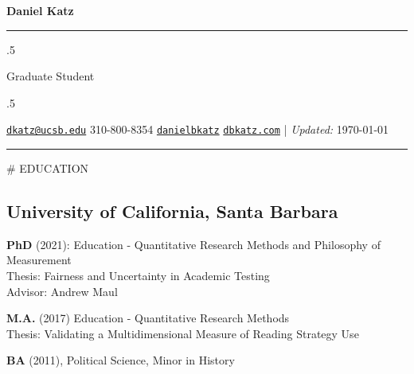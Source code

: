 \documentclass[11pt,]{article}
\begin{document}
\centerline{\huge \bf Daniel Katz}

\vspace{2 mm}

\hrule

\vspace{2 mm}

\moveleft.5\hoffset\centerline{Graduate Student}

\moveleft.5\hoffset\centerline{ \faEnvelopeO \hspace{1 mm} \href{mailto:}{\tt \href{mailto:dkatz@ucsb.edu}{\nolinkurl{dkatz@ucsb.edu}}} \hspace{1 mm}  \faPhone \hspace{1 mm}  310-800-8354  \hspace{1 mm}  \faGithub \hspace{1 mm} \href{http://github.com/danielbkatz}{\tt danielbkatz} \hspace{1 mm}     \faGlobe \hspace{1 mm} \href{http://dbkatz.com}{\tt dbkatz.com}    | \emph{Updated:} \apstylekinda\today}

\vspace{2 mm}

\hrule

\vspace{5mm}
\# EDUCATION

\hypertarget{university-of-california-santa-barbara}{%
\subsection{University of California, Santa
Barbara}\label{university-of-california-santa-barbara}}

\textbf{PhD} (2021): Education - Quantitative Research Methods and
Philosophy of Measurement\\
\hspace*{0.333em}\hspace*{0.333em}Thesis: Fairness and Uncertainty in
Academic Testing\\
\hspace*{0.333em}\hspace*{0.333em}Advisor: Andrew Maul

\textbf{M.A.} (2017) Education - Quantitative Research Methods\\
\hspace*{0.333em}\hspace*{0.333em} Thesis: Validating a Multidimensional
Measure of Reading Strategy Use

\textbf{BA} (2011), Political Science, Minor in History
\end{document}
